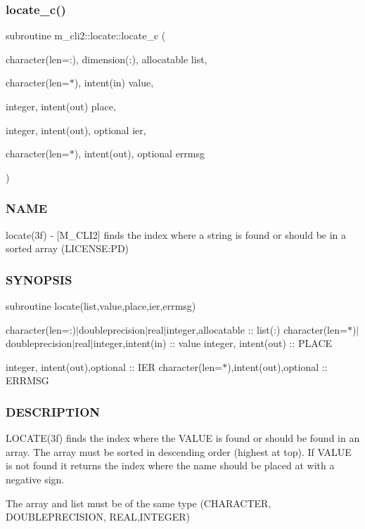 \subsubsection{\texorpdfstring{locate\+\_\+c()}{locate\_c()}}
{\footnotesize\ttfamily subroutine m\+\_\+cli2\+::locate\+::locate\+\_\+c (\begin{DoxyParamCaption}\item[{character(len=\+:), dimension(\+:), allocatable}]{list,  }\item[{character(len=$\ast$), intent(in)}]{value,  }\item[{integer, intent(out)}]{place,  }\item[{integer, intent(out), optional}]{ier,  }\item[{character(len=$\ast$), intent(out), optional}]{errmsg }\end{DoxyParamCaption})\hspace{0.3cm}{\ttfamily [private]}}



\subsubsection*{N\+A\+ME}

locate(3f) -\/ \mbox{[}M\+\_\+\+C\+L\+I2\mbox{]} finds the index where a string is found or should be in a sorted array (L\+I\+C\+E\+N\+SE\+:PD) 

\subsubsection*{S\+Y\+N\+O\+P\+S\+IS}

subroutine locate(list,value,place,ier,errmsg)

character(len=\+:)$\vert$doubleprecision$\vert$real$\vert$integer,allocatable \+:\+: list(\+:) character(len=$\ast$)$\vert$doubleprecision$\vert$real$\vert$integer,intent(in) \+:\+: value integer, intent(out) \+:\+: P\+L\+A\+CE

integer, intent(out),optional \+:\+: I\+ER character(len=$\ast$),intent(out),optional \+:\+: E\+R\+R\+M\+SG

\subsubsection*{D\+E\+S\+C\+R\+I\+P\+T\+I\+ON}

\begin{DoxyVerb}LOCATE(3f) finds the index where the VALUE is found or should
be found in an array. The array must be sorted in descending
order (highest at top). If VALUE is not found it returns the index
where the name should be placed at with a negative sign.

The array and list must be of the same type (CHARACTER, DOUBLEPRECISION,
REAL,INTEGER)
\end{DoxyVerb}


